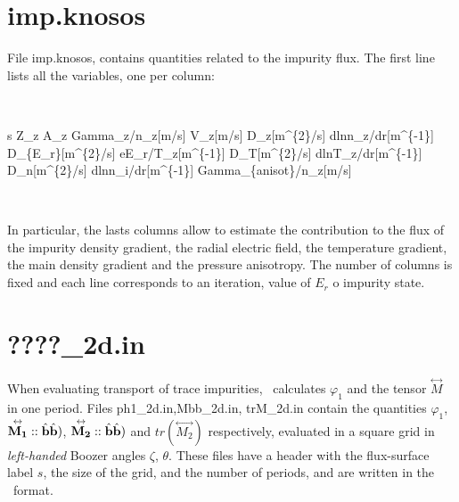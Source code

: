 
\section{\ttfamily imp.knosos}

File {\ttfamily imp.knosos}, contains quantities related to the impurity flux. The first line lists all the variables, one per column:

\

{\ttfamily s Z\_z  A\_z  Gamma\_z/n\_z[m/s]  V\_z[m/s]  D\_z[m\^{}\{2\}/s]  dlnn\_z/dr[m\^{}\{-1\}]  D\_\{E\_r\}[m\^{}\{2\}/s] eE\_r/T\_z[m\^{}\{-1\}]  D\_T[m\^{}\{2\}/s]  dlnT\_z/dr[m\^{}\{-1\}]  D\_n[m\^{}\{2\}/s]  dlnn\_i/dr[m\^{}\{-1\}] Gamma\_\{anisot\}/n\_z[m/s]}

\

In particular, the lasts columns allow to estimate the contribution to the flux of the impurity density gradient, the radial electric field, the temperature gradient, the main density gradient and the pressure anisotropy. The number of columns is fixed and each line corresponds to an iteration, value of $E_r$ o impurity state.



\section{\ttfamily ????\_2d.in}

When evaluating transport of trace impurities, \KNOSOS~calculates $\varphi_1$ and the tensor $\overset\leftrightarrow{M}$ in one period. Files {\ttfamily ph1\_2d.in},{\ttfamily Mbb\_2d.in}, {\ttfamily trM\_2d.in} contain the quantities $\varphi_1$, $\overset\leftrightarrow{\mathbf{M_1}}::\hat{\mathbf{b}}\hat{\mathbf{b}})$, $\overset\leftrightarrow{\mathbf{M_2}}::\hat{\mathbf{b}}\hat{\mathbf{b}})$ and $tr(\overset\leftrightarrow{M_2})$ respectively, evaluated in a square grid in \textit{left-handed} Boozer angles $\zeta$, $\theta$. These files have a header with the flux-surface label $s$, the size of the grid, and the number of periods, and are written in the \EUTERPE~format.
